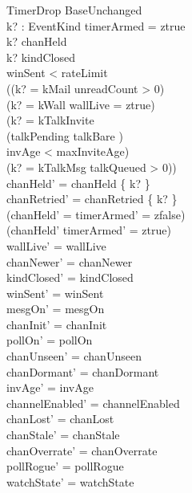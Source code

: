 \documentclass[a4paper,10pt,fleqn]{article}
\begin{document}
\begin{schema}{TimerDrop}
  BaseUnchanged \\
  k? : EventKind
  \where
  timerArmed = ztrue \\
  k? \in chanHeld \\
  k? \notin kindClosed \\
  winSent < rateLimit \\
  \lnot ((k? = kMail \land unreadCount > 0) \lor \\
  (k? = kWall \land wallLive = ztrue) \lor \\
  (k? = kTalkInvite \land \\
  \quad (\dom talkPending \neq \emptyset \lor talkBare \neq \emptyset) \land \\
  \quad invAge < maxInviteAge) \lor \\
  (k? = kTalkMsg \land talkQueued > 0)) \\
  chanHeld' = chanHeld \setminus \{ k? \} \\
  chanRetried' = chanRetried \setminus \{ k? \} \\
  (chanHeld' = \emptyset \implies timerArmed' = zfalse) \\
  (chanHeld' \neq \emptyset \implies timerArmed' = ztrue) \\
  wallLive' = wallLive \\
  chanNewer' = chanNewer \\
  kindClosed' = kindClosed \\
  winSent' = winSent \\
  mesgOn' = mesgOn \\
  chanInit' = chanInit \\
  pollOn' = pollOn \\
  chanUnseen' = chanUnseen \\
  chanDormant' = chanDormant \\
  invAge' = invAge \\
  channelEnabled' = channelEnabled \\
  chanLost' = chanLost \\
  chanStale' = chanStale \\
  chanOverrate' = chanOverrate \\
  pollRogue' = pollRogue \\
  watchState' = watchState
\end{schema}
\end{document}
